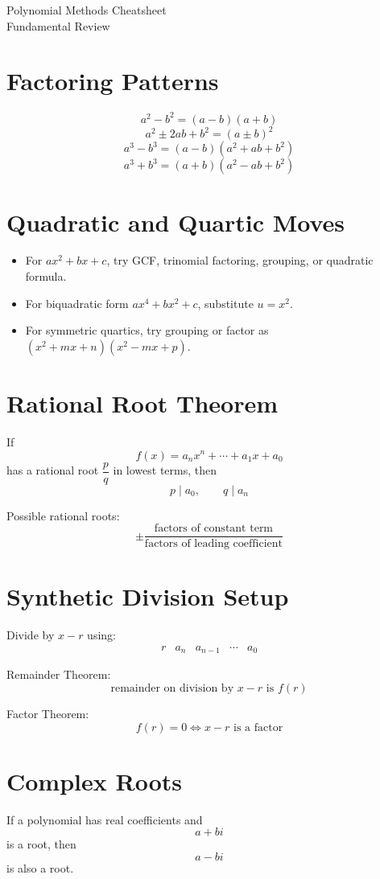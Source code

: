 \documentclass[11pt]{article}
\begin{document}
\begin{center}
{\LARGE Polynomial Methods Cheatsheet}\\[0.4em]
{\large Fundamental Review}
\end{center}

\section*{Factoring Patterns}
\[
a^2-b^2=(a-b)(a+b)
\]
\[
a^2\pm 2ab+b^2=(a\pm b)^2
\]
\[
a^3-b^3=(a-b)(a^2+ab+b^2)
\]
\[
a^3+b^3=(a+b)(a^2-ab+b^2)
\]

\section*{Quadratic and Quartic Moves}
\begin{itemize}
  \item For $ax^2+bx+c$, try GCF, trinomial factoring, grouping, or quadratic formula.
  \item For biquadratic form $ax^4+bx^2+c$, substitute $u=x^2$.
  \item For symmetric quartics, try grouping or factor as $(x^2+mx+n)(x^2-mx+p)$.
\end{itemize}

\section*{Rational Root Theorem}
If
\[
f(x)=a_nx^n+\cdots+a_1x+a_0
\]
has a rational root $\dfrac{p}{q}$ in lowest terms, then
\[
p\mid a_0,\qquad q\mid a_n
\]

Possible rational roots:
\[
\pm \frac{\text{factors of constant term}}{\text{factors of leading coefficient}}
\]

\section*{Synthetic Division Setup}
Divide by $x-r$ using:
\[
\begin{array}{r|rrrr}
r & a_n & a_{n-1} & \cdots & a_0
\end{array}
\]

Remainder Theorem:
\[
\text{remainder on division by } x-r \text{ is } f(r)
\]

Factor Theorem:
\[
f(r)=0 \iff x-r \text{ is a factor}
\]

\section*{Complex Roots}
If a polynomial has real coefficients and
\[
a+bi
\]
is a root, then
\[
a-bi
\]
is also a root.
\end{document}
